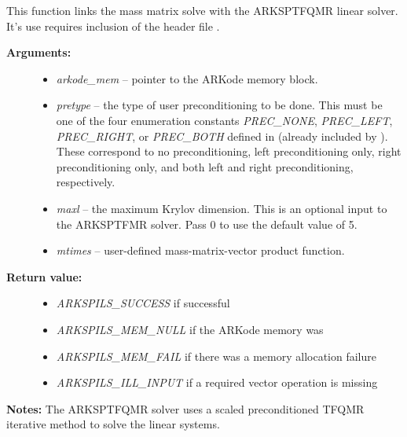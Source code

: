 \documentclass[letterpaper,10pt,english]{sphinxmanual}
\begin{document}

\begin{fulllineitems}
\label{c_interface/User_callable:ARKMassSptfqmr}
This function links the mass matrix solve with the ARKSPTFQMR
linear solver.  It's use requires inclusion of the header file
.
\begin{description}
\item[{\textbf{Arguments:}}] \leavevmode\begin{itemize}
\item {} 
\emph{arkode\_mem} -- pointer to the ARKode memory block.

\item {} 
\emph{pretype} -- the type of user preconditioning to be done.  This
must be one of the four enumeration constants \emph{PREC\_NONE},
\emph{PREC\_LEFT}, \emph{PREC\_RIGHT}, or \emph{PREC\_BOTH} defined in
 (already included by
). These correspond to no preconditioning,
left preconditioning only, right preconditioning only, and
both left and right preconditioning, respectively.

\item {} 
\emph{maxl} -- the maximum Krylov dimension. This is an optional input
to the ARKSPTFMR solver. Pass 0 to use the default value of 5.

\item {} 
\emph{mtimes} -- user-defined mass-matrix-vector product function.

\end{itemize}

\item[{\textbf{Return value:}}] \leavevmode\begin{itemize}
\item {} 
\emph{ARKSPILS\_SUCCESS} if successful

\item {} 
\emph{ARKSPILS\_MEM\_NULL}  if the ARKode memory was 

\item {} 
\emph{ARKSPILS\_MEM\_FAIL}  if there was a memory allocation failure

\item {} 
\emph{ARKSPILS\_ILL\_INPUT} if a required vector operation is missing

\end{itemize}

\end{description}

\textbf{Notes:} The ARKSPTFQMR solver uses a scaled preconditioned TFQMR
iterative method to solve the linear systems.

\end{fulllineitems}
\end{document}
